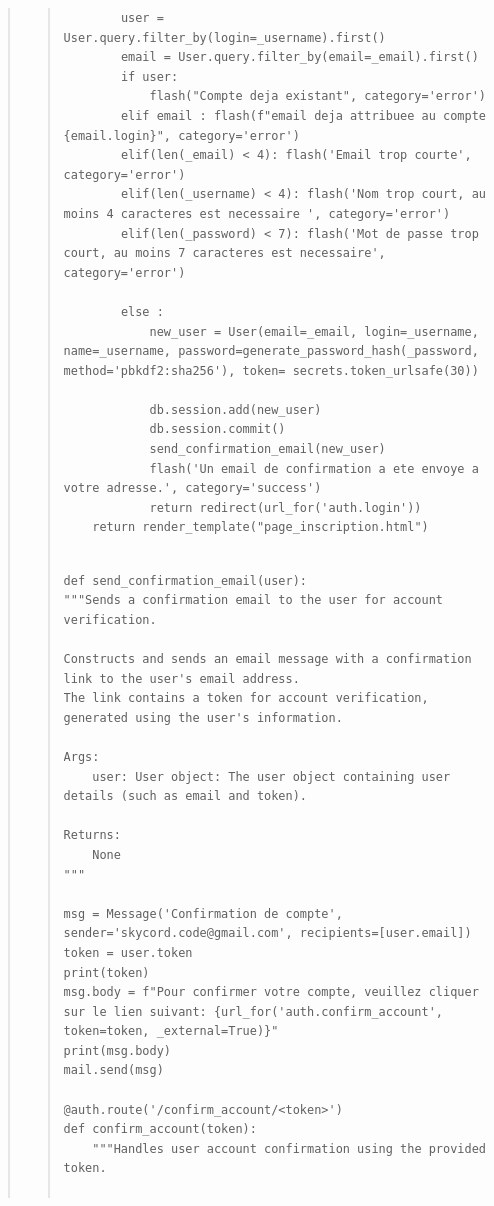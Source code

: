 \documentclass{article}
\begin{document}
\begin{quote}
\begin{quote}
\begin{tcolorbox}[colback=grisClair,colframe=black]
\begin{lstlisting}
        user = User.query.filter_by(login=_username).first()
        email = User.query.filter_by(email=_email).first()
        if user:
            flash("Compte deja existant", category='error')
        elif email : flash(f"email deja attribuee au compte {email.login}", category='error')
        elif(len(_email) < 4): flash('Email trop courte', category='error')
        elif(len(_username) < 4): flash('Nom trop court, au moins 4 caracteres est necessaire ', category='error')
        elif(len(_password) < 7): flash('Mot de passe trop court, au moins 7 caracteres est necessaire', category='error')
        
        else : 
            new_user = User(email=_email, login=_username, name=_username, password=generate_password_hash(_password, method='pbkdf2:sha256'), token= secrets.token_urlsafe(30))

            db.session.add(new_user)
            db.session.commit()
            send_confirmation_email(new_user)
            flash('Un email de confirmation a ete envoye a votre adresse.', category='success')
            return redirect(url_for('auth.login'))
    return render_template("page_inscription.html")


          \end{lstlisting}       
        \end{tcolorbox}


    \begin{tcolorbox}[colback=grisClair,colframe=black]
        \begin{lstlisting}
def send_confirmation_email(user):
"""Sends a confirmation email to the user for account verification.

Constructs and sends an email message with a confirmation link to the user's email address.
The link contains a token for account verification, generated using the user's information.

Args:
    user: User object: The user object containing user details (such as email and token).

Returns:
    None
"""

msg = Message('Confirmation de compte', sender='skycord.code@gmail.com', recipients=[user.email])
token = user.token
print(token)
msg.body = f"Pour confirmer votre compte, veuillez cliquer sur le lien suivant: {url_for('auth.confirm_account', token=token, _external=True)}"
print(msg.body)
mail.send(msg)

@auth.route('/confirm_account/<token>')
def confirm_account(token):
    """Handles user account confirmation using the provided token.


\end{lstlisting}
\end{tcolorbox}
\end{quote}
\end{quote}
\end{document}

